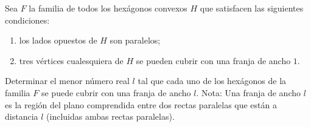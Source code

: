 Sea $F$ la familia de todos los hexágonos convexos $H$ que satisfacen las siguientes condiciones:
 \begin{enumerate} 
   \item los lados opuestos de $H$ son paralelos;
   \item tres vértices cualesquiera de $H$ se pueden cubrir con una franja de ancho $1$.
 \end{enumerate} 
Determinar el menor número real $l$ tal que cada uno de los hexágonos de la familia $F$ se puede cubrir con una franja de ancho $l$. \newline 
Nota: Una franja de ancho $l$ es la región del plano comprendida entre dos rectas paralelas que están a distancia $l$ (incluidas ambas rectas paralelas).
